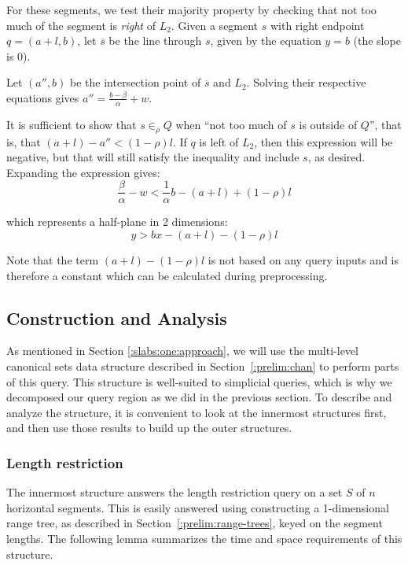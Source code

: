 For these segments, we test their majority property by checking that not too much of the segment is \emph{right} of $L_2$. Given a segment $s$ with right endpoint $q = (a+l,b)$, let $\overline{s}$ be the line through $s$, given by the equation $y = b$ (the slope is 0).

Let $(a'', b)$ be the intersection point of $\overline{s}$ and $L_2$. Solving their respective equations gives $a'' = \frac{b - \beta}{\alpha} + w$.

It is sufficient to show that $s \in_\rho Q$ when ``not too much of $s$ is outside of $Q$'', that is, that $(a + l) - a'' < (1 - \rho)l$. If $q$ is left of $L_2$, then this expression will be negative, but that will still satisfy the inequality and include $s$, as desired. Expanding the expression gives:
\[
\frac{\beta}{\alpha} - w < \frac{1}{\alpha} b - (a + l) + (1 - \rho)l 
\]

\noindent
which represents a half-plane in 2 dimensions:
\[
y > bx - (a + l) - (1 - \rho)l 
\]

Note that the term $(a + l) - (1 - \rho)l$ is not based on any query inputs and is therefore a constant which can be calculated during preprocessing.


\subsection{Construction and Analysis}
\label{:slabs:one:analysis}

As mentioned in Section \ref{:slabs:one:approach}, we will use the multi-level canonical sets data structure described in Section~\ref{:prelim:chan} to perform parts of this query.  This structure is well-suited to simplicial queries, which is why we decomposed our query region as we did in the previous section. To describe and analyze the structure, it is convenient to look at the innermost structures first, and then use those results to build up the outer structures.


\subsubsection{Length restriction}

The innermost structure answers the length restriction query on a set $S$ of $n$ horizontal segments. This is easily answered using constructing a 1-dimensional range tree, as described in Section~\ref{:prelim:range-trees}, keyed on the segment lengths. The following lemma summarizes the time and space requirements of this structure.

